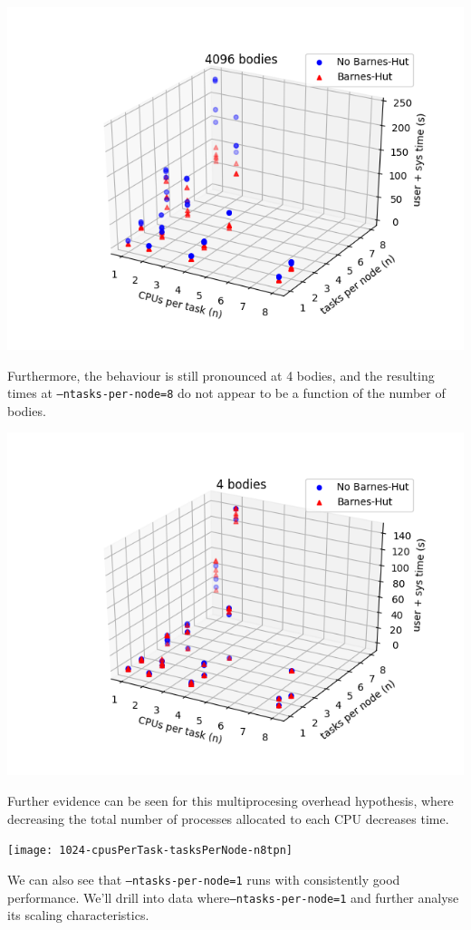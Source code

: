 \documentclass[11pt,a4paper]{article}
\begin{document}
\includegraphics[width=14.2cm]{4096-cpusPerTask-tasksPerNode}

Furthermore, the behaviour is still pronounced at 4 bodies, and the resulting times at \texttt{--ntasks-per-node=8} do not appear to be a function of the number of bodies.

\includegraphics[width=14.2cm]{4-cpusPerTask-tasksPerNode}

Further evidence can be seen for this multiprocesing overhead hypothesis, where decreasing the total number of processes allocated to each CPU decreases time.

\texttt{[image: 1024-cpusPerTask-tasksPerNode-n8tpn]}

We can also see that \texttt{--ntasks-per-node=1} runs with consistently good performance. We'll drill into data where\texttt{--ntasks-per-node=1} and further analyse its scaling characteristics.
\end{document}
